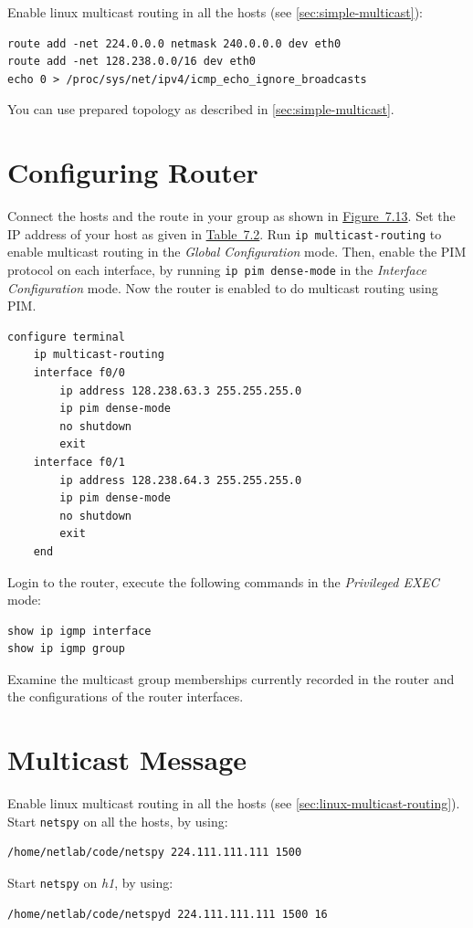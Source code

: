 \documentclass{../UTNetLab}
\begin{document}
    Enable linux multicast routing in all the hosts (see \autoref{sec:simple-multicast}):
    \begin{lstlisting}[emph={eth0}]
route add -net 224.0.0.0 netmask 240.0.0.0 dev eth0
route add -net 128.238.0.0/16 dev eth0
echo 0 > /proc/sys/net/ipv4/icmp_echo_ignore_broadcasts
    \end{lstlisting}

    You can use prepared topology as described in \autoref{sec:simple-multicast}.

\section{Configuring Router}
\label{sec:config-router}
    Connect the hosts and the route in your group as shown in \hyperref[fig:7.13]{Figure~7.13}.
    Set the IP address of your host as given in \hyperref[tab:7.2]{Table~7.2}.
    Run \lstinline{ip multicast-routing} to enable multicast routing in the \textit{Global Configuration} mode.
    Then, enable the PIM protocol on each interface, by running \lstinline{ip pim dense-mode} in the \textit{Interface Configuration} mode.
    Now the router is enabled to do multicast routing using PIM.
    \begin{lstlisting}[language=cisco]
configure terminal
    ip multicast-routing
    interface f0/0
        ip address 128.238.63.3 255.255.255.0
        ip pim dense-mode
        no shutdown
        exit
    interface f0/1
        ip address 128.238.64.3 255.255.255.0
        ip pim dense-mode
        no shutdown
        exit
    end
    \end{lstlisting}

    Login to the router, execute the following commands in the \textit{Privileged EXEC} mode:
    \begin{lstlisting}[language=cisco]
show ip igmp interface
show ip igmp group
    \end{lstlisting}

    \begin{report}
    \item Examine the multicast group memberships currently recorded in the router and the configurations of the router interfaces.
    \end{report}

\section{Multicast Message}
    Enable linux multicast routing in all the hosts (see \autoref{sec:linux-multicast-routing}).\\
    Start \lstinline{netspy} on all the hosts, by using:
    \begin{lstlisting}
/home/netlab/code/netspy 224.111.111.111 1500
    \end{lstlisting}
    Start \lstinline{netspy} on \textit{h1}, by using:
    \begin{lstlisting}
/home/netlab/code/netspyd 224.111.111.111 1500 16
    \end{lstlisting}
    
\end{document}
